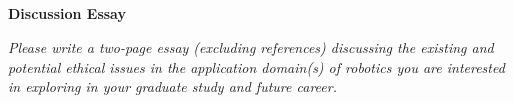 \documentclass[12pt]{article}
\title{
    \vspace{2in}
    \textmd{\textbf{\hmwkClass\ \hmwkTitle}}\\
    \vspace{3in}
}
\author{\hmwkAuthorName}
\date{  }
\begin{document}
\maketitle

\pagebreak

\begin{center}
    \large\textbf{Discussion Essay}
\end{center}

\textit{Please write a two-page essay (excluding references) discussing the existing and potential 
ethical issues in the application domain(s) of robotics you are interested in exploring in your 
graduate study and future career.}\\
\vspace{0in}\\
\lipsum[1]\\
\vspace{0in}\\
\lipsum[2]\\
\vspace{0in}\\
\lipsum[3]\\
\vspace{0in}\\
\lipsum[4]\\
\vspace{0in}\\
\lipsum[5]\\
\vspace{0in}\\
\lipsum[6]\\










\end{document}
